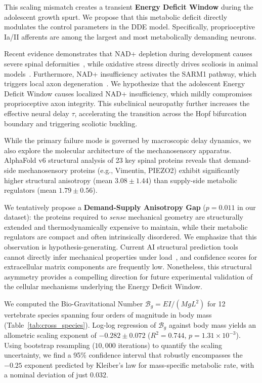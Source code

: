 \documentclass[11pt]{article}
\begin{document}
This scaling mismatch creates a transient \textbf{Energy Deficit Window} during the adolescent growth spurt. We propose that this metabolic deficit directly modulates the control parameters in the DDE model. Specifically, proprioceptive Ia/II afferents are among the largest and most metabolically demanding neurons.

Recent evidence demonstrates that NAD+ depletion during development causes severe spinal deformities~\cite{basse2021nampt}, while oxidative stress directly drives scoliosis in animal models~\cite{pumputis2025oxidative}. Furthermore, NAD+ insufficiency activates the SARM1 pathway, which triggers local axon degeneration~\cite{gerdts2015sarm1}. We hypothesize that the adolescent Energy Deficit Window causes localized NAD+ insufficiency, which mildly compromises proprioceptive axon integrity. This subclinical neuropathy further increases the effective neural delay $\tau$, accelerating the transition across the Hopf bifurcation boundary and triggering scoliotic buckling.

While the primary failure mode is governed by macroscopic delay dynamics, we also explore the molecular architecture of the mechanosensory apparatus. AlphaFold v6 structural analysis of 23 key spinal proteins reveals that demand-side mechanosensory proteins (e.g., Vimentin, PIEZO2) exhibit significantly higher structural anisotropy (mean $3.08 \pm 1.44$) than supply-side metabolic regulators (mean $1.79 \pm 0.56$).

We tentatively propose a \textbf{Demand-Supply Anisotropy Gap} ($p = 0.011$ in our dataset): the proteins required to \emph{sense} mechanical geometry are structurally extended and thermodynamically expensive to maintain, while their metabolic regulators are compact and often intrinsically disordered. We emphasize that this observation is hypothesis-generating. Current AI structural prediction tools cannot directly infer mechanical properties under load~\cite{gomes2022protein, zonta2024sequence}, and confidence scores for extracellular matrix components are frequently low. Nonetheless, this structural asymmetry provides a compelling direction for future experimental validation of the cellular mechanisms underlying the Energy Deficit Window.

We computed the Bio-Gravitational Number $\mathcal{B}_g = EI/(MgL^2)$ for 12 vertebrate species spanning four orders of magnitude in body mass (Table~\ref{tab:cross_species}). Log-log regression of $\mathcal{B}_g$ against body mass yields an allometric scaling exponent of $-0.282 \pm 0.072$ ($R^2 = 0.744$, $p = 1.31 \times 10^{-3}$). Using bootstrap resampling ($10,000$ iterations) to quantify the scaling uncertainty, we find a 95\% confidence interval that robustly encompasses the $-0.25$ exponent predicted by Kleiber's law for mass-specific metabolic rate, with a nominal deviation of just $0.032$.
\end{document}
